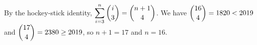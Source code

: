 By the hockey-stick identity, $\displaystyle\sum_{i=3}^{n}\dbinom i3=\dbinom{n+1}{4}$. We have $\dbinom{16}{4}=1820<2019$ and $\dbinom{17}{4}=2380\ge2019$, so $n+1=17$ and $n=\boxed{16}$.
